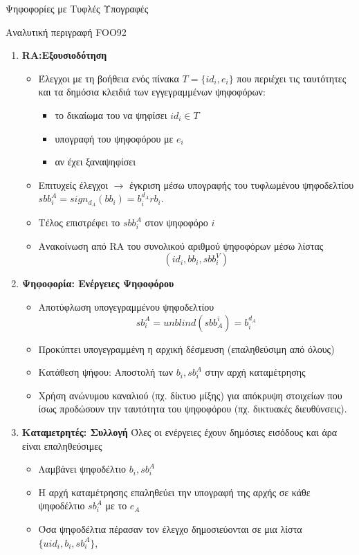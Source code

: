 \documentclass[handout]{beamer}
\begin{document}
\begin{section}{Ψηφοφορίες με Τυφλές Υπογραφές}
\begin{frame}[allowframebreaks]{Αναλυτική περιγραφή FOO92}
\begin{enumerate}
\item \textbf{RA:Εξουσιοδότηση}
\begin{itemize}
\item Έλεγχοι με τη βοήθεια ενός πίνακα $T = \{ id_i, e_i\}$ που περιέχει τις ταυτότητες και τα δημόσια κλειδιά των εγγεγραμμένων ψηφοφόρων:
\begin{itemize}
    \item το δικαίωμα του να ψηφίσει $id_i \in T$
    \item υπογραφή του ψηφοφόρου με $e_i$
    \item αν έχει ξαναψηφίσει
\end{itemize}  
\item Επιτυχείς έλεγχοι $\rightarrow$ έγκριση μέσω υπογραφής του τυφλωμένου ψηφοδελτίου $sbb_i^A = sign_{d_A}(bb_i) = b_i^{d_A} rb_{i}$.
\item Τέλος επιστρέφει το $sbb_i^A$ στον ψηφοφόρο $i$
\item Ανακοίνωση από RA του συνολικού αριθμού ψηφοφόρων μέσω λίστας $$(id_i,bb_i,sbb_i^V)$$
\end{itemize}

\framebreak

\item \textbf{Ψηφοφορία: Ενέργειες Ψηφοφόρου}
\begin{itemize}
\item Αποτύφλωση υπογεγραμμένου ψηφοδελτίου $$sb_i^A = unblind(sbb^i_A)=b_i^{d_A}$$
\item Προκύπτει υπογεγραμμένη η αρχική δέσμευση (επαληθεύσιμη από όλους)
\item Κατάθεση ψήφου: Αποστολή των $b_i,sb_i^A$ στην αρχή καταμέτρησης
\item Χρήση ανώνυμου καναλιού (πχ. δίκτυο μίξης) για απόκρυψη στοιχείων που ίσως προδώσουν την ταυτότητα του ψηφοφόρου (πχ. δικτυακές διευθύνσεις).
\end{itemize}

\framebreak

\item \textbf{Καταμετρητές: Συλλογή}
Όλες οι ενέργειες έχουν δημόσιες εισόδους και άρα είναι επαληθεύσιμες 
\begin{itemize}
\item Λαμβάνει ψηφοδέλτιο $b_i,sb_i^A$
\item Η αρχή καταμέτρησης επαληθεύει την υπογραφή της αρχής σε κάθε ψηφοδέλτιο $sb_i^A$ με το $e_A$
\item Όσα ψηφοδέλτια πέρασαν τον έλεγχο δημοσιεύονται σε μια λίστα $\{ uid_i, b_i, sb_i^A \}$, 


\end{itemize}
\end{enumerate}
\end{frame}
\end{section}
\end{document}
